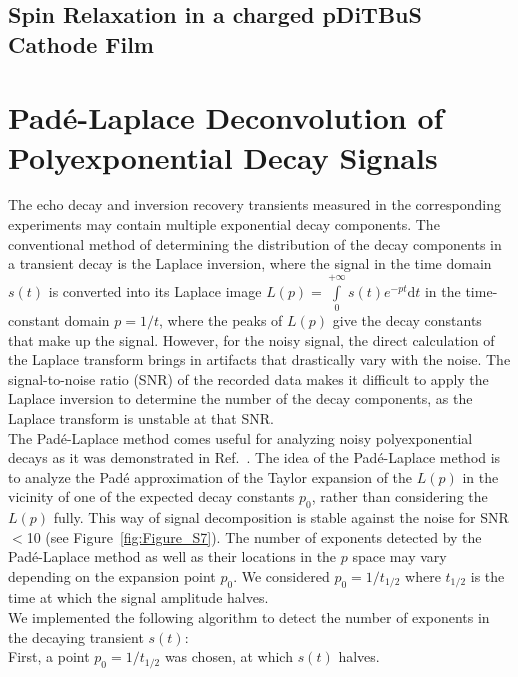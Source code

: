 \subsection{Spin Relaxation in a charged pDiTBuS Cathode Film}

\section{Pad{\'e}-Laplace Deconvolution of Polyexponential Decay Signals}
\label{sec:pade-laplace}
The echo decay and inversion recovery transients measured in the corresponding experiments may contain multiple exponential decay components. The conventional method of determining the distribution of the decay components in a transient decay is the Laplace inversion, where the signal in the time domain $s(t)$ is converted into its Laplace image $L(p)=\int\limits_{0}^{+\infty}s(t)e^{-pt}\mathrm{d}t$ in the time-constant domain $p=1/t$, where the peaks of $L(p)$ give the decay constants that make up the signal. However, for the noisy signal, the direct calculation of the Laplace transform brings in artifacts that drastically vary with the noise. The signal-to-noise ratio (SNR) of the recorded data makes it difficult to apply the Laplace inversion to determine the number of the decay components, as the Laplace transform is unstable at that SNR. \\ 


The Pad{\'e}-Laplace method comes useful for analyzing noisy polyexponential decays as it was demonstrated in Ref.~\cite{Hellen_2005}. The idea of the Pad{\'e}-Laplace method is to analyze the Pad{\'e} approximation of the Taylor expansion of the $L(p)$ in the vicinity of one of the expected decay constants $p_0$, rather than considering the $L(p)$ fully. This way of signal decomposition is stable against the noise for SNR$<$10 (see Figure~\ref{fig:Figure_S7}). The number of exponents detected by the Pad{\'e}-Laplace method as well as their locations in the $p$ space may vary depending on the expansion point $p_0$. We considered $p_0=1/t_{1/2}$ where $t_{1/2}$ is the time at which the signal amplitude halves.\\

We implemented the following algorithm to detect the number of exponents in the decaying transient $s(t)$:\\

First, a point $p_0=1/t_{1/2}$ was chosen, at which $s(t)$ halves.\\

